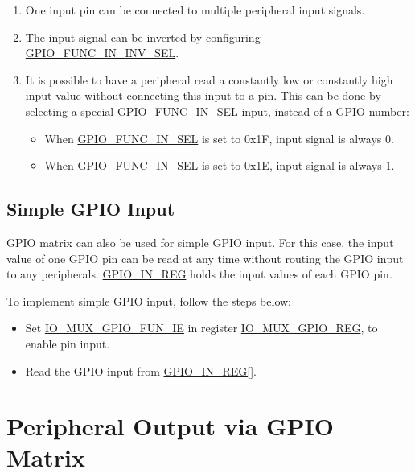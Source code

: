 \documentclass[main\_\_EN.tex]{subfiles}
\begin{document}
\begin{tiplisting}
\vspace{-2em}
\begin{enumerate}
\item \label{input-note-1} One input pin can be connected to multiple peripheral input signals.
\item \label{input-note-2} The input signal can be inverted by configuring \hyperref[fielddesc:GPIOFUNCNININVSEL]{GPIO\_FUNC\_IN\_INV\_SEL}.
\item \label{input-note-3} It is possible to have a peripheral read a constantly low or constantly high input value without connecting this input to a pin. This can be done by selecting a special \hyperref[fielddesc:GPIOFUNCNINSEL]{GPIO\_FUNC\_IN\_SEL} input, instead of a GPIO number:
\begin {itemize}
\item When \hyperref[fielddesc:GPIOFUNCNINSEL]{GPIO\_FUNC\_IN\_SEL} is set to 0x1F, input signal is always 0.
\item When \hyperref[fielddesc:GPIOFUNCNINSEL]{GPIO\_FUNC\_IN\_SEL} is set to 0x1E, input signal is always 1.
\end{itemize}
\end{enumerate}
\end{tiplisting}

\subsection{Simple GPIO Input}\label{IOMUXSimpleGPIOInput}

GPIO matrix can also be used for simple GPIO input. For this case, the input value of one GPIO pin can be read at any time without routing the GPIO input to any peripherals. \hyperref[regdesc:GPIOINREG]{GPIO\_IN\_REG} holds the input values of each GPIO pin.

To implement simple GPIO input, follow the steps below:

\begin{itemize}
    \item Set \hyperref[fielddesc:IOMUXGPIONFUNIE]{IO\_MUX\_GPIO\_FUN\_IE} in register \hyperref[regdesc:IOMUXGPIONREG]{IO\_MUX\_GPIO\_REG}, to enable pin input.
    \item Read the GPIO input from \hyperref[regdesc:GPIOINREG]{GPIO\_IN\_REG[]}.
\end{itemize}


\section{Peripheral Output via GPIO Matrix}
\end{document}
